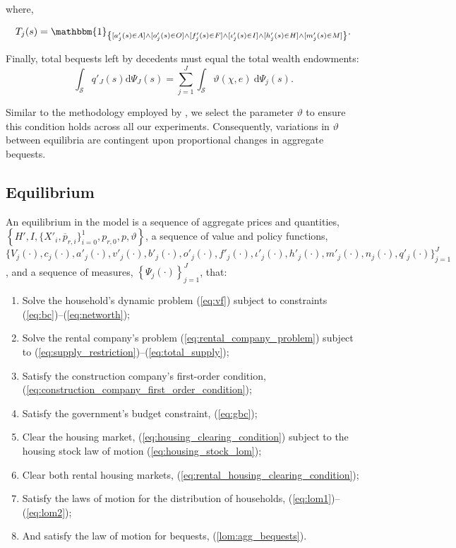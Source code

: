 \documentclass[parskip=full]{article}
\newcommand{\indicator}[1]{\mathbbm{1}_{\left\{ {#1} \right\} }}
\begin{document}
\noindent where,

\begin{align}
    T_{j}(s) = \indicator{[a'_{j}(s)\in A] \land [o'_{j}(s)\in O] \land [f'_{j}(s)\in F] \land [\iota'_{j}(s)\in I] \land [h'_{j}(s) \in H] \land [m'_{j}(s) \in M]}.\notag
\end{align}

Finally, total bequests left by decedents must equal the total wealth endowments:
\begin{equation}\label{lom:agg_bequests}
      \int_{\mathcal{S}} q'_{J}(s) \mathrm{d}\Psi_{J}(s) =  \sum_{j=1}^J \int_{\mathcal{S}} \vartheta (\chi,e)\ \mathrm{d}\Psi_j(s).
\end{equation}

\noindent Similar to the methodology employed by \citet{kkk-2021}, we select the parameter $\vartheta$ to ensure this condition holds across all our experiments. Consequently, variations in $\vartheta$ between equilibria are contingent upon proportional changes in aggregate bequests.

\subsection{Equilibrium}
An equilibrium in the model is a sequence of aggregate prices and quantities, $\left\{H',I,\{X'_{i},\overline{p}_{r,i}\}^{1}_{i=0},p_{r,0},p,\vartheta \right\}$, a sequence of value and policy functions, $\biggl\{V_{j}(\cdot),c_{j}(\cdot),a'_{j}(\cdot),v'_{j}(\cdot),b'_{j}(\cdot),o'_{j}(\cdot),f'_{j}(\cdot),\iota'_{j}(\cdot),h'_{j}(\cdot),m'_{j}(\cdot),n_{j}(\cdot),q'_{j}(\cdot)\biggl\}_{j=1}^J$, and a sequence of measures, $\left\{\Psi_{j}(\cdot)\right\}_{j=1}^J$, that:
\begin{enumerate}
\item Solve the household's dynamic problem (\ref{eq:vf}) subject to constraints (\ref{eq:bc})--(\ref{eq:networth});
\item Solve the rental company's problem (\ref{eq:rental_company_problem}) subject to (\ref{eq:supply_restriction})--(\ref{eq:total_supply});
\item Satisfy the construction company's first-order condition, (\ref{eq:construction_company_first_order_condition});
\item Satisfy the government's budget constraint, (\ref{eq:gbc});
\item Clear the housing market,
(\ref{eq:housing_clearing_condition}) subject to the housing stock law of motion (\ref{eq:housing_stock_lom});
\item Clear both rental housing markets,
(\ref{eq:rental_housing_clearing_condition});
\item Satisfy the laws of motion for the distribution of households, (\ref{eq:lom1})--(\ref{eq:lom2});
\item And satisfy the law of motion for bequests, (\ref{lom:agg_bequests}).
\end{enumerate}
\end{document}
